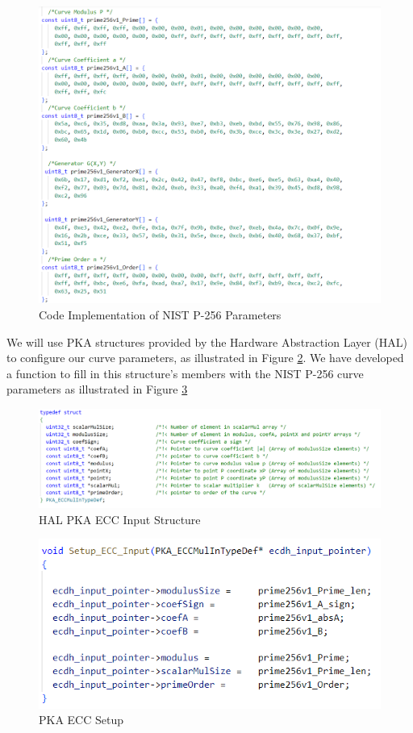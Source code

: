 \begin{figure}[H]
    \centering
    \includegraphics[width=19cm]{img/ecdsa curve params code.png}
    \caption{Code Implementation of NIST P-256 Parameters}
    \label{fig:curvo}
\end{figure}

We will use PKA structures provided by the Hardware Abstraction Layer (HAL) to configure our curve parameters, as illustrated in Figure \ref{fig:ecc struct}.
We have developed a function to fill in this structure's members with the NIST P-256 curve parameters as illustrated in Figure \ref{fig:pka_ecc_func}

\begin{figure}[H]
    \centering
    \includegraphics[width=18cm]{img/ecc struct.png}
    \caption{HAL PKA ECC Input Structure}
    \label{fig:ecc struct}
\end{figure}


\begin{figure}[H]
    \centering
    \includegraphics[width=15cm]{img/ecc func.png}
    \caption{PKA ECC Setup}
    \label{fig:pka_ecc_func}
\end{figure}

